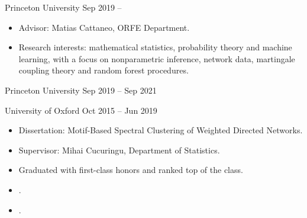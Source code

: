 \documentclass[
  date,
  number,
]{wgu-cv}
\begin{document}
\maketitle

\renewcommand{\natexlab}[1]{}

\setlength{\emergencystretch}{2pt}


{Princeton University}
{Sep 2019 --}

\begin{itemize}
  \item Advisor:
    Matias Cattaneo, ORFE Department.
  \item Research interests:
    mathematical statistics, probability theory
    and machine learning,
    with a focus on
    nonparametric inference,
    network data,
    martingale coupling theory and
    random forest procedures.
\end{itemize}

{Princeton University}
{Sep 2019 -- Sep 2021}

\bigskip

{University of Oxford}
{Oct 2015 -- Jun 2019}

\begin{itemize}
  \item Dissertation:
    Motif-Based Spectral Clustering of Weighted Directed Networks.
  \item Supervisor:
    Mihai Cucuringu,
    Department of Statistics.
  \item Graduated with first-class honors and ranked top of the class.
\end{itemize}


\begin{itemize}
  \item {}.
  \item {}.
\end{itemize}
\end{document}
